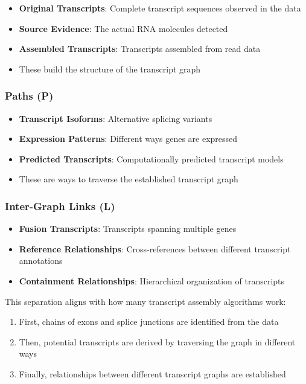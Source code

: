 \documentclass{article}
\begin{document}
\begin{itemize}
	\item \textbf{Original Transcripts}: Complete transcript sequences observed in the data
	\item \textbf{Source Evidence}: The actual RNA molecules detected
	\item \textbf{Assembled Transcripts}: Transcripts assembled from read data
	\item These build the structure of the transcript graph
\end{itemize}

\subsubsection{Paths (P)}

\begin{itemize}
	\item \textbf{Transcript Isoforms}: Alternative splicing variants
	\item \textbf{Expression Patterns}: Different ways genes are expressed
	\item \textbf{Predicted Transcripts}: Computationally predicted transcript models
	\item These are ways to traverse the established transcript graph
\end{itemize}

\subsubsection{Inter-Graph Links (L)}

\begin{itemize}
	\item \textbf{Fusion Transcripts}: Transcripts spanning multiple genes
	\item \textbf{Reference Relationships}: Cross-references between different transcript annotations
	\item \textbf{Containment Relationships}: Hierarchical organization of transcripts
\end{itemize}

This separation aligns with how many transcript assembly algorithms work:

\begin{enumerate}
	\item First, chains of exons and splice junctions are identified from the data
	\item Then, potential transcripts are derived by traversing the graph in different ways
	\item Finally, relationships between different transcript graphs are established
\end{enumerate}
\end{document}
